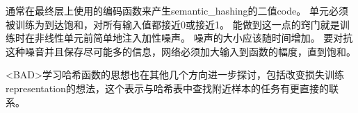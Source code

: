 通常在最终层上使用的编码函数来产生\gls{semantic_hashing}的二值\gls{code}。
单元必须被训练为到达饱和，对所有输入值都接近0或接近1。
能做到这一点的窍门就是训练时在非线性单元前简单地注入加性噪声。
噪声的大小应该随时间增加。
要对抗这种噪音并且保存尽可能多的信息，网络必须加大输入到函数的幅度，直到饱和。


<BAD>学习哈希函数的思想也在其他几个方向进一步探讨，包括改变损失训练\gls{representation}的想法，这个表示与哈希表中查找附近样本的任务有更直接的联系\citep{Norouzi+Fleet-ICML2011}。
